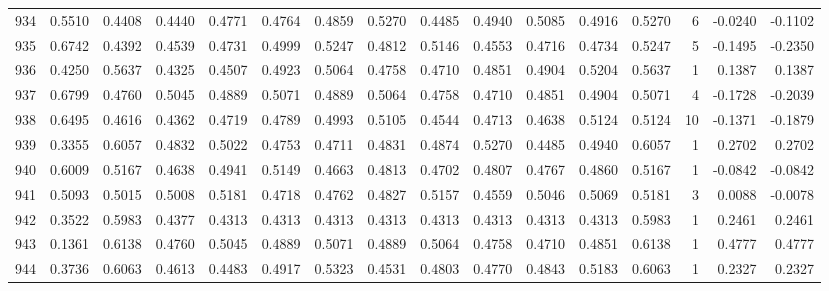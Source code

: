 \begin{tabular}{lrrrrrrrrrrrrrrr}
934 &      0.5510 &  0.4408 &  0.4440 &  0.4771 &  0.4764 &  0.4859 &  0.5270 &  0.4485 &  0.4940 &  0.5085 &   0.4916 &     0.5270 &      6 &                   -0.0240 &                    -0.1102 \\
935 &      0.6742 &  0.4392 &  0.4539 &  0.4731 &  0.4999 &  0.5247 &  0.4812 &  0.5146 &  0.4553 &  0.4716 &   0.4734 &     0.5247 &      5 &                   -0.1495 &                    -0.2350 \\
936 &      0.4250 &  0.5637 &  0.4325 &  0.4507 &  0.4923 &  0.5064 &  0.4758 &  0.4710 &  0.4851 &  0.4904 &   0.5204 &     0.5637 &      1 &                    0.1387 &                     0.1387 \\
937 &      0.6799 &  0.4760 &  0.5045 &  0.4889 &  0.5071 &  0.4889 &  0.5064 &  0.4758 &  0.4710 &  0.4851 &   0.4904 &     0.5071 &      4 &                   -0.1728 &                    -0.2039 \\
938 &      0.6495 &  0.4616 &  0.4362 &  0.4719 &  0.4789 &  0.4993 &  0.5105 &  0.4544 &  0.4713 &  0.4638 &   0.5124 &     0.5124 &     10 &                   -0.1371 &                    -0.1879 \\
939 &      0.3355 &  0.6057 &  0.4832 &  0.5022 &  0.4753 &  0.4711 &  0.4831 &  0.4874 &  0.5270 &  0.4485 &   0.4940 &     0.6057 &      1 &                    0.2702 &                     0.2702 \\
940 &      0.6009 &  0.5167 &  0.4638 &  0.4941 &  0.5149 &  0.4663 &  0.4813 &  0.4702 &  0.4807 &  0.4767 &   0.4860 &     0.5167 &      1 &                   -0.0842 &                    -0.0842 \\
941 &      0.5093 &  0.5015 &  0.5008 &  0.5181 &  0.4718 &  0.4762 &  0.4827 &  0.5157 &  0.4559 &  0.5046 &   0.5069 &     0.5181 &      3 &                    0.0088 &                    -0.0078 \\
942 &      0.3522 &  0.5983 &  0.4377 &  0.4313 &  0.4313 &  0.4313 &  0.4313 &  0.4313 &  0.4313 &  0.4313 &   0.4313 &     0.5983 &      1 &                    0.2461 &                     0.2461 \\
943 &      0.1361 &  0.6138 &  0.4760 &  0.5045 &  0.4889 &  0.5071 &  0.4889 &  0.5064 &  0.4758 &  0.4710 &   0.4851 &     0.6138 &      1 &                    0.4777 &                     0.4777 \\
944 &      0.3736 &  0.6063 &  0.4613 &  0.4483 &  0.4917 &  0.5323 &  0.4531 &  0.4803 &  0.4770 &  0.4843 &   0.5183 &     0.6063 &      1 &                    0.2327 &                     0.2327 \\

\end{tabular}
